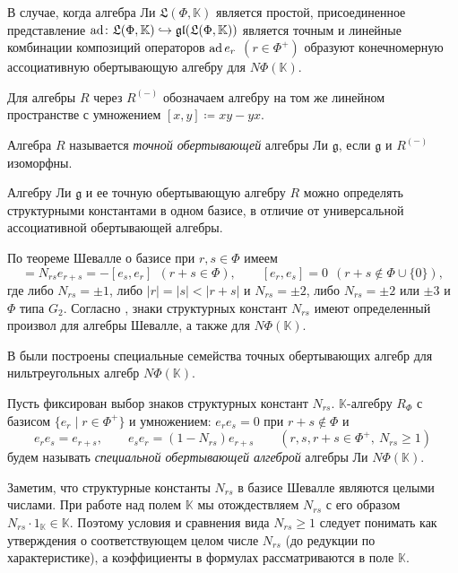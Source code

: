 \documentclass[a4paper,14pt,oneside,openany]{memoir}
\begin{document}
В случае, когда алгебра Ли $\mathfrak{L}(\Phi, \mathbb{K})$ является простой,
присоединенное представление $\operatorname{ad} \colon \mathfrak{L}(\Phi, \mathbb{K})
\hookrightarrow \mathfrak{gl}(\mathfrak{L}(\Phi, \mathbb{K}))$ является точным
и линейные комбинации композиций операторов $\operatorname{ad} e_r$ $(r\in\Phi^+)$ образуют
конечномерную ассоциативную обертывающую алгебру для $N\Phi(\mathbb{K})$.

\medskip

Для алгебры $R$ через $R^{(-)}$ обозначаем алгебру на том же линейном
пространстве с умножением $[x,y]\coloneq xy-yx$.

\begin{definition}
    Алгебра $R$ называется \emph{точной обертывающей} алгебры Ли $\mathfrak{g}$,
    если $\mathfrak{g}$ и $R^{(-)}$ изоморфны.
\end{definition}
%
Алгебру Ли $\mathfrak{g}$ и ее точную обертывающую алгебру $R$ можно определять
структурными константами в одном базисе, в отличие от универсальной
ассоциативной обертывающей алгебры.

\medskip

По теореме Шевалле о базисе \cite[теорема 4.2.1]{carter72} при $r,s\in \Phi$
имеем
\begin{equation*}%
    [e_r ,e_s] = N_{rs}e_{r+s}=-[e_s ,e_r] \ \ (r+s\in \Phi),
    \qquad [e_r,e_s]=0 \  \  (r+s\notin \Phi \cup \{0\}),
\end{equation*}
%
где либо $N_{rs}=\pm 1$, либо $|r|=|s|<|r+s|$ и $N_{rs}=\pm 2$, либо
$N_{rs}=\pm 2$ или $\pm 3$ и $\Phi$ типа $G_2$. Согласно \cite[предложение
4.2.2]{carter72}, знаки структурных констант $N_{rs}$ имеют определенный
произвол для алгебры Шевалле, а также для $N\Phi(\mathbb{K})$.

\medskip

В \cite{DAN2018} были построены специальные семейства точных обертывающих
алгебр для нильтреугольных алгебр $N\Phi(\mathbb{K})$.

\begin{definition}\label{def:RPhi}
    Пусть фиксирован выбор знаков структурных констант $N_{rs}$.
    $\mathbb{K}$-алгебру $R_{\Phi}$ с базисом $\{e_r \mid r \in \Phi^+\}$ и
    умножением: $e_r e_s = 0$ при $r + s \notin \Phi$ и
    \[
        e_r e_s = e_{r+s}, \qquad e_s e_r = (1 - N_{rs}) e_{r+s}
        \qquad (r, s, r+s \in \Phi^+,\ N_{rs} \geq 1)
    \]
    будем называть \emph{специальной обертывающей алгеброй} алгебры Ли
    $N\Phi(\mathbb{K})$.
\end{definition}
Заметим, что структурные константы $N_{rs}$ в базисе Шевалле являются целыми
числами. При работе над полем $\mathbb{K}$ мы отождествляем $N_{rs}$ с его
образом $N_{rs}\cdot 1_{\mathbb{K}}\in \mathbb{K}$. Поэтому условия и сравнения
вида $N_{rs}\geq 1$ следует понимать как утверждения о соответствующем целом
числе $N_{rs}$ (до редукции по характеристике), а коэффициенты в формулах
рассматриваются в поле $\mathbb{K}$.
\end{document}
